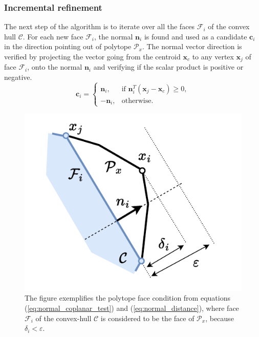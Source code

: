 \subsubsection{Incremental refinement} The next step of the algorithm is to iterate over all the faces $\mathcal{F}_i$ of the convex hull $\mathcal{C}$. For each new face $\mathcal{F}_i$, the normal $\bm{n}_i$ is found and used as a candidate $\bm{c}_i$ in the direction pointing out of polytope $\mathcal{P}_x$.
The normal vector direction is verified by projecting the vector going from the centroid $\bm{x}_c$ to any vertex $\bm{x}_{j}$ of face $\mathcal{F}_i$, onto the normal $\bm{n}_i$ and verifying if the scalar product is positive or negative.
\begin{equation}
    \bm{c}_i = \begin{cases}
  \bm{n}_i, & \text{if } \bm{n}_i^T(\bm{x}_{j} - \bm{x}_c) \geq 0, \\
  -\bm{n}_i, & \text{otherwise}.
\end{cases} 
\label{eq:normal_condition}
\end{equation}
\begin{figure}
    \centering
    \includegraphics[width=\linewidth]{Papers/images/espilon_explicaiton.pdf}
    \caption{ The figure exemplifies the polytope face condition from equations (\ref{eq:normal_coplanar_test}) and (\ref{eq:normal_distance}), where  face $\mathcal{F}_i$ of the convex-hull $\mathcal{C}$ is considered to be the face of $\mathcal{P}_x$, because $\delta_i\! < \!\varepsilon$. }
    \label{fig:expilon_explication}
\end{figure}
